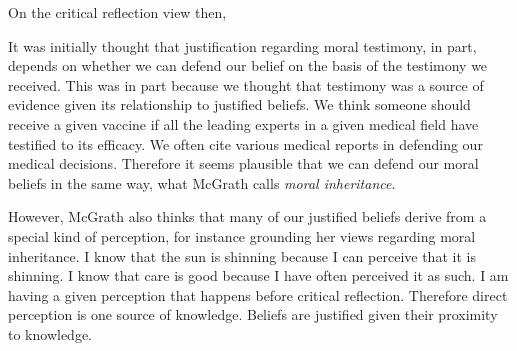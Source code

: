 \documentclass[phdthesis,12pt,final]{wuthesis}
\theoremstyle{definition}
\theoremstyle{definition}
\theoremstyle{definition}
\theoremstyle{definition}
\theoremstyle{remark}
\begin{document}
On the critical reflection view then,

\begin{Shaded}
\begin{Highlighting}[]

\end{Highlighting}
\end{Shaded}

\begin{Shaded}
\begin{Highlighting}[]

\end{Highlighting}
\end{Shaded}

\begin{Shaded}
\begin{Highlighting}[]

\end{Highlighting}
\end{Shaded}

It was initially thought that justification regarding moral testimony, in part, depends on whether we can defend our belief on the basis of the testimony we received. This was in part because we thought that testimony was a source of evidence given its relationship to justified beliefs. We think someone should receive a given vaccine if all the leading experts in a given medical field have testified to its efficacy. We often cite various medical reports in defending our medical decisions. Therefore it seems plausible that we can defend our moral beliefs in the same way, what McGrath calls \emph{moral inheritance}.

However, McGrath also thinks that many of our justified beliefs derive from a special kind of perception, for instance grounding her views regarding moral inheritance. I know that the sun is shinning because I can perceive that it is shinning. I know that care is good because I have often perceived it as such. I am having a given perception that happens before critical reflection. Therefore direct perception is one source of knowledge. Beliefs are justified given their proximity to knowledge.
\end{document}
